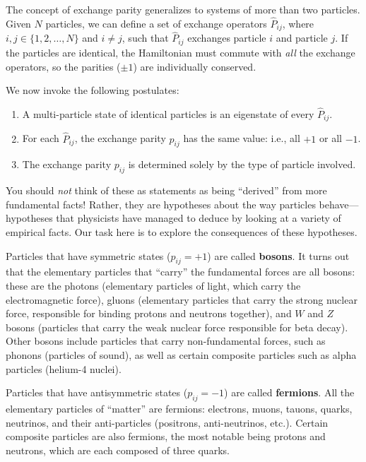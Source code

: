 \documentclass[pra,12pt]{revtex4}
\begin{document}
The concept of exchange parity generalizes to systems of more than two
particles.  Given $N$ particles, we can define a set of exchange
operators $\hat{P}_{ij}$, where $i,j\in\{1,2,\dots,N\}$ and $i\ne j$,
such that $\hat{P}_{ij}$ exchanges particle $i$ and particle $j$.  If
the particles are identical, the Hamiltonian must commute with
\textit{all} the exchange operators, so the parities ($\pm 1$) are
individually conserved.

We now invoke the following postulates:
\begin{enumerate}
\item A multi-particle state of identical particles is an eigenstate
  of every $\hat{P}_{ij}$.

\item For each $\hat{P}_{ij}$, the exchange parity $p_{ij}$ has the
  same value: i.e., all $+1$ or all $-1$.

\item The exchange parity $p_{ij}$ is determined solely by the type of
  particle involved.
\end{enumerate}
You should \textit{not} think of these as statements as being
``derived'' from more fundamental facts!  Rather, they are hypotheses
about the way particles behave---hypotheses that physicists have
managed to deduce by looking at a variety of empirical facts.  Our
task here is to explore the consequences of these hypotheses.

Particles that have symmetric states ($p_{ij} = +1$) are called
\textbf{bosons}.  It turns out that the elementary particles that
``carry'' the fundamental forces are all bosons: these are the photons
(elementary particles of light, which carry the electromagnetic
force), gluons (elementary particles that carry the strong nuclear
force, responsible for binding protons and neutrons together), and $W$
and $Z$ bosons (particles that carry the weak nuclear force
responsible for beta decay).  Other bosons include particles that
carry non-fundamental forces, such as phonons (particles of sound), as
well as certain composite particles such as alpha particles (helium-4
nuclei).

Particles that have antisymmetric states ($p_{ij} = -1$) are called
\textbf{fermions}.  All the elementary particles of ``matter'' are
fermions: electrons, muons, tauons, quarks, neutrinos, and their
anti-particles (positrons, anti-neutrinos, etc.).  Certain composite
particles are also fermions, the most notable being protons and
neutrons, which are each composed of three quarks.
\end{document}
